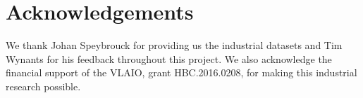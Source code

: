 \documentclass[preprint,12pt]{elsarticle}
\begin{document}
	\section*{Acknowledgements}
	
	We thank Johan Speybrouck for providing us the industrial datasets and Tim Wynants for his feedback throughout this project. We also acknowledge the financial support of the VLAIO, grant HBC.2016.0208, for making this industrial research possible.
	
	
	
	
	
	
	
	
	
	
	
	
\end{document}
